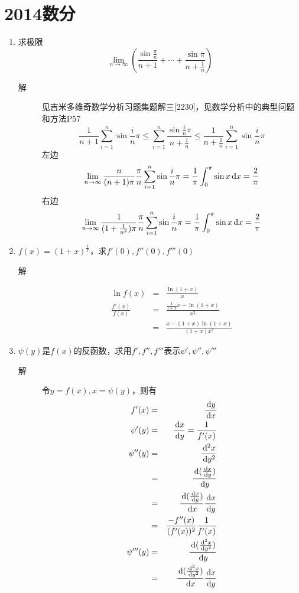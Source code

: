 \section{2014数分}
\begin{enumerate}
\item 求极限
\[
\lim_{n \to \infty} \left( \frac{\sin \frac{\pi}{n}}{n+1} + \cdots + \frac{\sin\pi}{n+\frac{1}{n}}\right)
\]
\begin{description}
\item[解] 见吉米多维奇数学分析习题集题解三[2230]，见数学分析中的典型问题和方法P57
\[
\frac{1}{n+1} \sum_{i=1}^n \sin\frac{i}{n}\pi \leq \sum_{i=1}^n \frac{\sin\frac{i}{n}\pi}{n+\frac{i}{n}} \leq \frac{1}{n+\frac{1}{n}} \sum_{i=1}^n \sin\frac{i}{n}\pi
\]
左边
\[
\lim_{n\to \infty} \frac{n}{(n+1)\pi} \frac{\pi}{n}\sum_{i=1}^n\sin\frac{i}{n}\pi = \frac{1}{\pi}\int_0^\pi \sin x\,\mathrm{d} x = \frac{2}{\pi}
\]
右边
\[
\lim_{n\to \infty} \frac{1}{(1+\frac{1}{n^2})\pi} \frac{\pi}{n}\sum_{i=1}^n\sin\frac{i}{n}\pi = \frac{1}{\pi}\int_0^\pi \sin x\,\mathrm{d} x = \frac{2}{\pi}
\]
\end{description}

\item $f(x)=(1+x)^{\frac{1}{x}}$，求$f'(0),f''(0),f'''(0)$
\begin{description}
\item[解]
\begin{eqnarray*}
\ln f(x)&=&\frac{\ln(1+x)}{x}\\
\frac{f'(x)}{f(x)}&=&\frac{\frac{1}{1+x}x-\ln(1+x)}{x^2}\\
&=&\frac{x-(1+x)\ln(1+x)}{(1+x)x^2}
\end{eqnarray*}
\end{description}

\item $\psi(y)$是$f(x)$的反函数，求用$f',f'',f'''$表示$\psi',\psi'',\psi'''$
\begin{description}
\item[解] 令$y=f(x),x=\psi(y)$，则有
\begin{eqnarray*}
f'(x) &=& \frac{\,\mathrm{d} y}{\,\mathrm{d} x}\\
\psi'(y) &=& \frac{\,\mathrm{d} x}{\,\mathrm{d} y} = \frac{1}{f'(x)}\\
\psi''(y) &=& \frac{\,\mathrm{d}^2x}{\,\mathrm{d} y^2} \\
&=& \frac{\,\mathrm{d} (\frac{\,\mathrm{d} x}{\,\mathrm{d} y})}{\,\mathrm{d} y}\\
&=& \frac{\,\mathrm{d} (\frac{\,\mathrm{d} x}{\,\mathrm{d} y})}{\,\mathrm{d} x} \frac{\,\mathrm{d} x}{\,\mathrm{d} y}\\
&=& \frac{-f''(x)}{(f'(x))^2} \frac{1}{f'(x)}\\
\psi'''(y) &=& \frac{\,\mathrm{d} (\frac{\,\mathrm{d}^2x}{\,\mathrm{d} y^2})}{\,\mathrm{d} y}\\
&=& \frac{\,\mathrm{d} (\frac{\,\mathrm{d}^2x}{\,\mathrm{d} y^2})}{\,\mathrm{d} x} \frac{\,\mathrm{d} x}{\,\mathrm{d} y}
\end{eqnarray*}
\end{description}


\end{enumerate}
